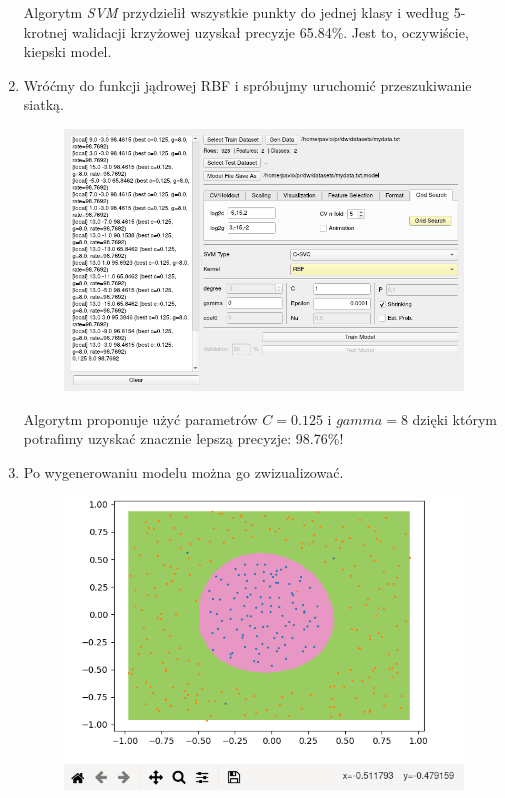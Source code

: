 \documentclass[paper=a4, fontsize=11pt]{scrartcl} %
\numberwithin{equation}{section} %
\numberwithin{figure}{section} %
\begin{document}
\begin{enumerate}[label={\textbf{Krok \theenumi :}},leftmargin=*]
    Algorytm \textit{SVM} przydzielił wszystkie punkty do jednej klasy i według 5-krotnej
    walidacji krzyżowej uzyskał precyzje 65.84\%. Jest to, oczywiście, kiepski model.
    
    \item Wróćmy do funkcji jądrowej RBF i spróbujmy uruchomić przeszukiwanie siatką.

    \begin{figure}[H]
        \begin{center}
            \includegraphics[scale=0.66]{./img/ex3_st5.png}
        \end{center}
    \end{figure}

    Algorytm proponuje użyć parametrów $C=0.125$ i $gamma=8$ dzięki którym potrafimy uzyskać
    znacznie lepszą precyzje: 98.76\%!

    \newpage
    \item Po wygenerowaniu modelu można go zwizualizować.

    \begin{figure}[H]
        \begin{center}
            \includegraphics[scale=0.69]{./img/ex3_st6.png}
        \end{center}
    \end{figure}


\end{enumerate}
\end{document}
